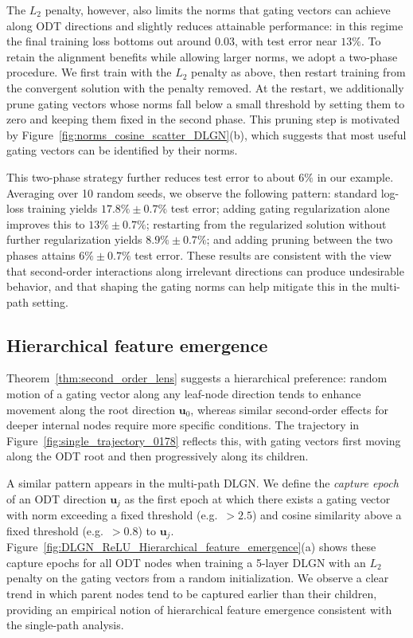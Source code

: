 \documentclass{article}
\theoremstyle{plain}
\theoremstyle{definition}
\theoremstyle{remark}
\newcommand{\1}{{\mathbf 1}}
\newcommand{\0}{{\mathbf 0}}
\newcommand{\bu}{{\mathbf u}}
\renewcommand{\>}{{\rightarrow}}
\begin{document}
The $L_2$ penalty, however, also limits the norms that gating vectors can achieve along ODT directions and slightly reduces attainable performance: in this regime the final training loss bottoms out around $0.03$, with test error near $13\%$. To retain the alignment benefits while allowing larger norms, we adopt a two-phase procedure. We first train with the $L_2$ penalty as above, then restart training from the convergent solution with the penalty removed. At the restart, we additionally prune gating vectors whose norms fall below a small threshold by setting them to zero and keeping them fixed in the second phase. This pruning step is motivated by Figure~\ref{fig:norms_cosine_scatter_DLGN}(b), which suggests that most useful gating vectors can be identified by their norms.

This two-phase strategy further reduces test error to about $6\%$ in our example. Averaging over 10 random seeds, we observe the following pattern: standard log-loss training yields $17.8\%\pm0.7\%$ test error; adding gating regularization alone improves this to $13\%\pm0.7\%$; restarting from the regularized solution without further regularization yields $8.9\%\pm0.7\%$; and adding pruning between the two phases attains $6\%\pm0.7\%$ test error. These results are consistent with the view that second-order interactions along irrelevant directions can produce undesirable behavior, and that shaping the gating norms can help mitigate this in the multi-path setting.

\subsection{Hierarchical feature emergence}
\label{sec:hierarchical_feature_emergence}

Theorem~\ref{thm:second_order_lens} suggests a hierarchical preference: random motion of a gating vector along any leaf-node direction tends to enhance movement along the root direction $\bu_0$, whereas similar second-order effects for deeper internal nodes require more specific conditions. The trajectory in Figure~\ref{fig:single_trajectory_0178} reflects this, with gating vectors first moving along the ODT root and then progressively along its children.

A similar pattern appears in the multi-path DLGN. We define the \emph{capture epoch} of an ODT direction $\bu_j$ as the first epoch at which there exists a gating vector with norm exceeding a fixed threshold (e.g.\ $>2.5$) and cosine similarity above a fixed threshold (e.g.\ $>0.8$) to $\bu_j$. Figure~\ref{fig:DLGN_ReLU_Hierarchical_feature_emergence}(a) shows these capture epochs for all ODT nodes when training a 5-layer DLGN with an $L_2$ penalty on the gating vectors from a random initialization. We observe a clear trend in which parent nodes tend to be captured earlier than their children, providing an empirical notion of hierarchical feature emergence consistent with the single-path analysis.
\end{document}
